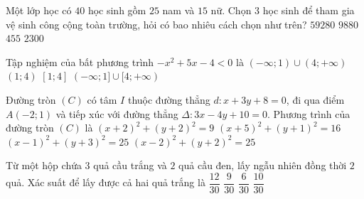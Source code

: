 \begin{ex}%
	Một lớp học có $40$ học sinh gồm $25$ nam và $15$ nữ. Chọn $3$ học sinh để tham gia vệ sinh công cộng toàn trường, hỏi có bao nhiêu cách chọn như trên?
	\choice
	{$59280$}
	{\True $9880$}
	{$455$}
	{$2300$}
\end{ex}

\begin{ex}%
	Tập nghiệm của bất phương trình $-x^2+5 x-4<0$ là
	\choice
	{\True $(-\infty ; 1)\cup(4 ;+\infty)$}
	{$(1 ; 4)$}
	{$[1 ; 4]$}
	{$(-\infty ; 1]\cup[4 ;+\infty)$}
\end{ex}

\begin{ex}%
	Đường tròn $(C)$ có tâm $I$ thuộc đường thẳng $d\colon x+3 y+8=0$, đi qua điểm $A(-2 ; 1)$ và tiếp xúc với đường thẳng $\Delta\colon 3x-4y+10=0$. Phương trình của đường tròn $(C)$ là
	\choice
	{$(x+2)^2+(y+2)^2=9$}
	{$(x+5)^2+(y+1)^2=16$}
	{\True $(x-1)^2+(y+3)^2=25$}
	{$(x-2)^2+(y+2)^2=25$}
\end{ex}

\begin{ex}%
	Từ một hộp chứa $3$ quả cầu trắng và $2$ quả cầu đen, lấy ngẫu nhiên đồng thời $2$ quả. Xác suất để lấy được cả hai quả trắng là
	\choice
	{$\dfrac{12}{30}$}
	{\True $\dfrac{9}{30}$}
	{$\dfrac{6}{30}$}
	{$\dfrac{10}{30}$}
\end{ex}

